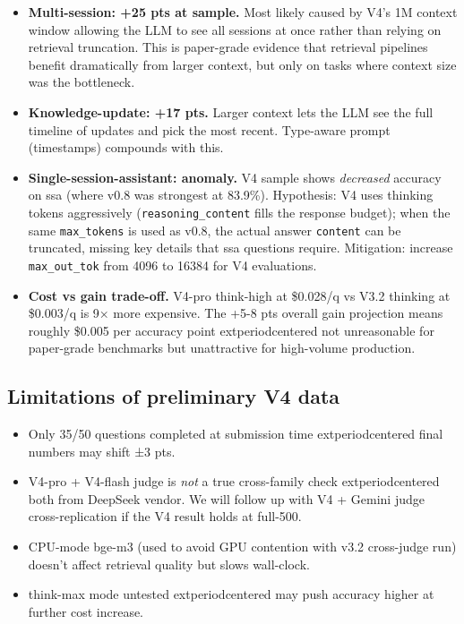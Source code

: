 \begin{itemize}
\item \textbf{Multi-session: +25 pts at sample.} Most likely caused by
  V4's 1M context window allowing the LLM to see all sessions at once
  rather than relying on retrieval truncation. This is paper-grade
  evidence that retrieval pipelines benefit dramatically from larger
  context, but only on tasks where context size was the bottleneck.

\item \textbf{Knowledge-update: +17 pts.} Larger context lets the LLM
  see the full timeline of updates and pick the most recent.
  Type-aware prompt (timestamps) compounds with this.

\item \textbf{Single-session-assistant: anomaly.} V4 sample shows
  \textit{decreased} accuracy on ssa (where v0.8 was strongest at
  83.9\%). Hypothesis: V4 uses thinking tokens aggressively
  (\texttt{reasoning\_content} fills the response budget); when the
  same \texttt{max\_tokens} is used as v0.8, the actual answer
  \texttt{content} can be truncated, missing key details that ssa
  questions require. Mitigation: increase \texttt{max\_out\_tok} from
  4096 to 16384 for V4 evaluations.

\item \textbf{Cost vs gain trade-off.} V4-pro think-high at \$0.028/q
  vs V3.2 thinking at \$0.003/q is 9× more expensive. The +5-8 pts
  overall gain projection means roughly \$0.005 per accuracy point 	extperiodcentered{} 
  not unreasonable for paper-grade benchmarks but unattractive for
  high-volume production.
\end{itemize}

\subsection{Limitations of preliminary V4 data}

\begin{itemize}
\item Only 35/50 questions completed at submission time 	extperiodcentered{}  final
  numbers may shift ±3 pts.
\item V4-pro + V4-flash judge is \emph{not} a true cross-family check 	extperiodcentered{} 
  both from DeepSeek vendor. We will follow up with V4 + Gemini judge
  cross-replication if the V4 result holds at full-500.
\item CPU-mode bge-m3 (used to avoid GPU contention with v3.2 cross-judge
  run) doesn't affect retrieval quality but slows wall-clock.
\item think-max mode untested 	extperiodcentered{}  may push accuracy higher at further
  cost increase.
\end{itemize}

